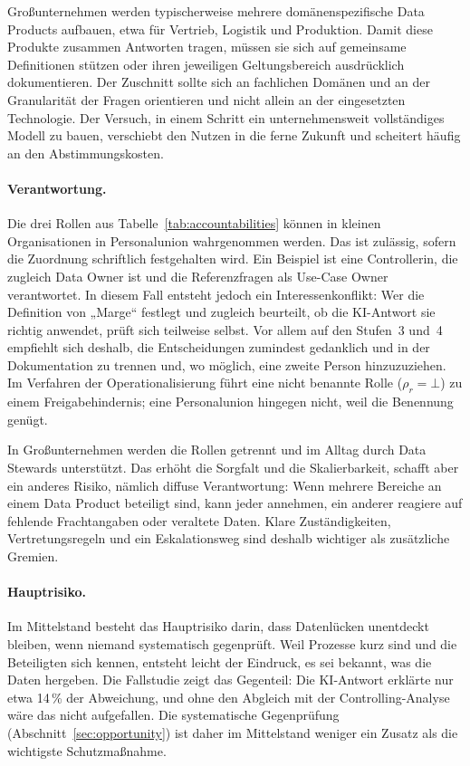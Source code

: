 \documentclass[a4paper,12pt]{article}
\theoremstyle{definition}
\begin{document}
Großunternehmen werden typischerweise mehrere domänenspezifische Data Products aufbauen, etwa für Vertrieb, Logistik und Produktion. Damit diese Produkte zusammen Antworten tragen, müssen sie sich auf gemeinsame Definitionen stützen oder ihren jeweiligen Geltungsbereich ausdrücklich dokumentieren. Der Zuschnitt sollte sich an fachlichen Domänen und an der Granularität der Fragen orientieren und nicht allein an der eingesetzten Technologie. Der Versuch, in einem Schritt ein unternehmensweit vollständiges Modell zu bauen, verschiebt den Nutzen in die ferne Zukunft und scheitert häufig an den Abstimmungskosten.

\paragraph{Verantwortung.}
Die drei Rollen aus Tabelle~\ref{tab:accountabilities} können in kleinen Organisationen in Personalunion wahrgenommen werden. Das ist zulässig, sofern die Zuordnung schriftlich festgehalten wird. Ein Beispiel ist eine Controllerin, die zugleich Data Owner ist und die Referenzfragen als Use-Case Owner verantwortet. In diesem Fall entsteht jedoch ein Interessenkonflikt: Wer die Definition von „Marge“ festlegt und zugleich beurteilt, ob die KI-Antwort sie richtig anwendet, prüft sich teilweise selbst. Vor allem auf den Stufen~3 und~4 empfiehlt sich deshalb, die Entscheidungen zumindest gedanklich und in der Dokumentation zu trennen und, wo möglich, eine zweite Person hinzuzuziehen. Im Verfahren der Operationalisierung führt eine nicht benannte Rolle ($\rho_r=\bot$) zu einem Freigabehindernis; eine Personalunion hingegen nicht, weil die Benennung genügt.

In Großunternehmen werden die Rollen getrennt und im Alltag durch Data Stewards unterstützt. Das erhöht die Sorgfalt und die Skalierbarkeit, schafft aber ein anderes Risiko, nämlich diffuse Verantwortung: Wenn mehrere Bereiche an einem Data Product beteiligt sind, kann jeder annehmen, ein anderer reagiere auf fehlende Frachtangaben oder veraltete Daten. Klare Zuständigkeiten, Vertretungsregeln und ein Eskalationsweg sind deshalb wichtiger als zusätzliche Gremien.

\paragraph{Hauptrisiko.}
Im Mittelstand besteht das Hauptrisiko darin, dass Datenlücken unentdeckt bleiben, wenn niemand systematisch gegenprüft. Weil Prozesse kurz sind und die Beteiligten sich kennen, entsteht leicht der Eindruck, es sei bekannt, was die Daten hergeben. Die Fallstudie zeigt das Gegenteil: Die KI-Antwort erklärte nur etwa 14\,\% der Abweichung, und ohne den Abgleich mit der Controlling-Analyse wäre das nicht aufgefallen. Die systematische Gegenprüfung (Abschnitt~\ref{sec:opportunity}) ist daher im Mittelstand weniger ein Zusatz als die wichtigste Schutzmaßnahme.
\end{document}
